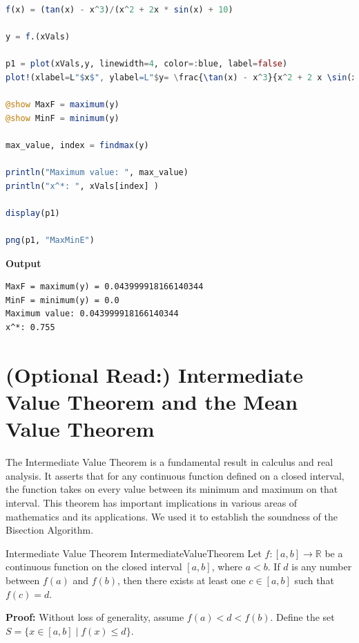\begin{enumerate}
\begin{lstlisting}[language=Julia,style=mystyle]
f(x) = (tan(x) - x^3)/(x^2 + 2x * sin(x) + 10)

y = f.(xVals)

p1 = plot(xVals,y, linewidth=4, color=:blue, label=false)
plot!(xlabel=L"$x$", ylabel=L"$y= \frac{\tan(x) - x^3}{x^2 + 2 x \sin(x) + 10}$") 

@show MaxF = maximum(y)
@show MinF = minimum(y)

max_value, index = findmax(y)

println("Maximum value: ", max_value)
println("x^*: ", xVals[index] )

display(p1)

png(p1, "MaxMinE")
\end{lstlisting}
\textbf{Output} 
\begin{verbatim}
MaxF = maximum(y) = 0.043999918166140344
MinF = minimum(y) = 0.0
Maximum value: 0.043999918166140344
x^*: 0.755
\end{verbatim}

\end{enumerate}


\Qed

\bigskip

\section{(Optional Read:) Intermediate Value Theorem and the Mean Value Theorem}
\label{sec:AdditionalResultsChap04}

The Intermediate Value Theorem is a fundamental result in calculus and real analysis. It asserts that for any continuous function defined on a closed interval, the function takes on every value between its minimum and maximum on that interval. This theorem has important implications in various areas of mathematics and its applications. We used it to establish the soundness of the Bisection Algorithm.

\bigskip

\begin{propColor}{Intermediate Value Theorem }{IntermediateValueTheorem } Let \( f: [a, b] \to \mathbb{R} \) be a continuous function on the closed interval \([a, b]\), where \( a < b \). If \( d \) is any number between \( f(a) \) and \( f(b) \), then there exists at least one \( c \in [a, b] \) such that \( f(c) = d \).
    
\end{propColor}

\textbf{Proof:} Without loss of generality, assume \( f(a) < d < f(b) \). Define the set \( S = \{ x \in [a, b] \mid f(x) \leq d \} \). \\

